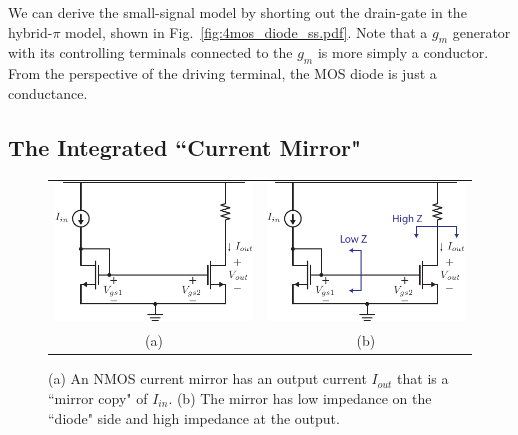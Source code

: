 We can derive the small-signal model by shorting out the drain-gate in the hybrid-$\pi$ model, shown in Fig.~\ref{fig:4mos_diode_ss.pdf}.  Note that a $g_m$ generator with its controlling terminals connected to the $g_m$ is more simply a conductor.  From the perspective of the driving terminal, the MOS diode is just a conductance.
 


\subsection{The Integrated ``Current Mirror"}

\begin{figure}[tb]
\begin{center}
\begin{tabular}{cc}
\includegraphics[scale=1]{5mirror_105.pdf} &
\includegraphics[scale=1]{5bmirror_105.pdf} \\
(a) & (b) \\
\end{tabular}
\end{center}
\caption{(a) An NMOS current mirror has an output current $I_{out}$ that is a ``mirror copy" of $I_{in}$.  (b) The mirror has low impedance on the ``diode" side and high impedance at the output.} \label{fig:5mirror_105.pdf}
\end{figure}



